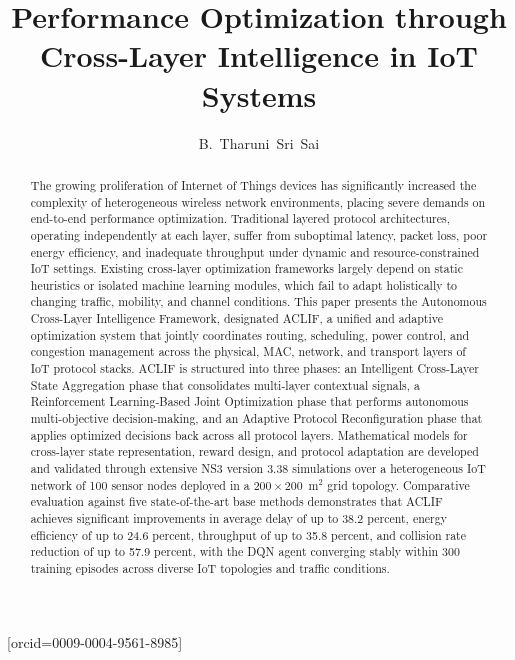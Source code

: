 \documentclass[a4paper]{cas-dc}
\numberwithin{equation}{section}
\begin{document}
\let\WriteBookmarks\relax
\def\floatpagepagefraction{1}
\def\textpagefraction{.001}



\title[mode = title]{Performance Optimization through Cross-Layer Intelligence in IoT Systems}

\author[1]{B.~Tharuni~Sri~Sai}[orcid=0009-0004-9561-8985]
\cormark[1]


\sloppy

\begin{abstract}
The growing proliferation of Internet of Things devices has significantly increased the complexity of heterogeneous wireless network environments, placing severe demands on end-to-end performance optimization. Traditional layered protocol architectures, operating independently at each layer, suffer from suboptimal latency, packet loss, poor energy efficiency, and inadequate throughput under dynamic and resource-constrained IoT settings. Existing cross-layer optimization frameworks largely depend on static heuristics or isolated machine learning modules, which fail to adapt holistically to changing traffic, mobility, and channel conditions. This paper presents the Autonomous Cross-Layer Intelligence Framework, designated ACLIF, a unified and adaptive optimization system that jointly coordinates routing, scheduling, power control, and congestion management across the physical, MAC, network, and transport layers of IoT protocol stacks. ACLIF is structured into three phases: an Intelligent Cross-Layer State Aggregation phase that consolidates multi-layer contextual signals, a Reinforcement Learning-Based Joint Optimization phase that performs autonomous multi-objective decision-making, and an Adaptive Protocol Reconfiguration phase that applies optimized decisions back across all protocol layers. Mathematical models for cross-layer state representation, reward design, and protocol adaptation are developed and validated through extensive NS3 version 3.38 simulations over a heterogeneous IoT network of 100 sensor nodes deployed in a $200\times200$~m$^2$ grid topology. Comparative evaluation against five state-of-the-art base methods demonstrates that ACLIF achieves significant improvements in average delay of up to 38.2 percent, energy efficiency of up to 24.6 percent, throughput of up to 35.8 percent, and collision rate reduction of up to 57.9 percent, with the DQN agent converging stably within 300 training episodes across diverse IoT topologies and traffic conditions.
\end{abstract}
\end{document}
